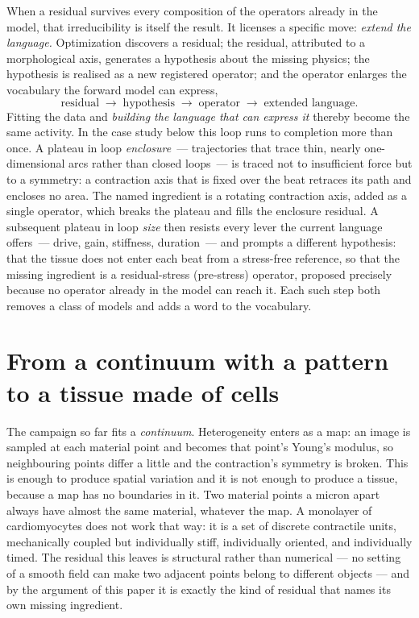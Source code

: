 \documentclass[11pt]{article}
\begin{document}
When a residual survives every composition of the operators already in the model, that irreducibility is itself the result. It licenses a specific move: \emph{extend the language.} Optimization discovers a residual; the residual, attributed to a morphological axis, generates a hypothesis about the missing physics; the hypothesis is realised as a new registered operator; and the operator enlarges the vocabulary the forward model can express,
\[
\text{residual} \;\longrightarrow\; \text{hypothesis} \;\longrightarrow\; \text{operator} \;\longrightarrow\; \text{extended language}.
\]
Fitting the data and \emph{building the language that can express it} thereby become the same activity. In the case study below this loop runs to completion more than once. A plateau in loop \emph{enclosure}~--- trajectories that trace thin, nearly one-dimensional arcs rather than closed loops~--- is traced not to insufficient force but to a symmetry: a contraction axis that is fixed over the beat retraces its path and encloses no area. The named ingredient is a rotating contraction axis, added as a single operator, which breaks the plateau and fills the enclosure residual. A subsequent plateau in loop \emph{size} then resists every lever the current language offers~--- drive, gain, stiffness, duration~--- and prompts a different hypothesis: that the tissue does not enter each beat from a stress-free reference, so that the missing ingredient is a residual-stress (pre-stress) operator, proposed precisely because no operator already in the model can reach it. Each such step both removes a class of models and adds a word to the vocabulary.

\section{From a continuum with a pattern to a tissue made of cells}

The campaign so far fits a \emph{continuum}. Heterogeneity enters as a map: an image is sampled at
each material point and becomes that point's Young's modulus, so neighbouring points differ a
little and the contraction's symmetry is broken. This is enough to produce spatial variation and it
is not enough to produce a tissue, because a map has no boundaries in it. Two material points a
micron apart always have almost the same material, whatever the map. A monolayer of cardiomyocytes
does not work that way: it is a set of discrete contractile units, mechanically coupled but
individually stiff, individually oriented, and individually timed. The residual this leaves is
structural rather than numerical --- no setting of a smooth field can make two adjacent points
belong to different objects --- and by the argument of this paper it is exactly the kind of
residual that names its own missing ingredient.
\end{document}
